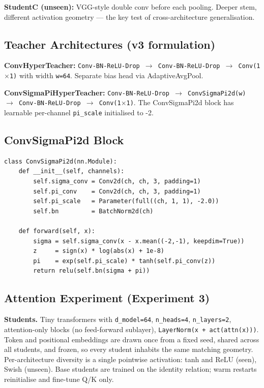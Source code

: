 \documentclass{article}
\begin{document}
\textbf{StudentC (unseen):} VGG-style double conv before each pooling. Deeper stem, different activation geometry --- the key test of cross-architecture generalisation.

\subsection{Teacher Architectures (v3 formulation)}\label{teacher-architectures-v3-formulation}

\textbf{ConvHyperTeacher:} \texttt{Conv-BN-ReLU-Drop\ $\to$\ Conv-BN-ReLU-Drop\ $\to$\ Conv(1$\times$1)} with width \texttt{w=64}. Separate bias head via AdaptiveAvgPool.

\textbf{ConvSigmaPiHyperTeacher:} \texttt{Conv-BN-ReLU-Drop\ $\to$\ ConvSigmaPi2d(w)\ $\to$\ Conv-BN-ReLU-Drop\ $\to$\ Conv(1$\times$1)}. The ConvSigmaPi2d block has learnable per-channel \texttt{pi\_scale} initialised to -2.

\subsection{ConvSigmaPi2d Block}\label{convsigmapi2d-block}

\begin{verbatim}
class ConvSigmaPi2d(nn.Module):
    def __init__(self, channels):
        self.sigma_conv = Conv2d(ch, ch, 3, padding=1)
        self.pi_conv    = Conv2d(ch, ch, 3, padding=1)
        self.pi_scale   = Parameter(full((ch, 1, 1), -2.0))
        self.bn         = BatchNorm2d(ch)

    def forward(self, x):
        sigma = self.sigma_conv(x - x.mean((-2,-1), keepdim=True))
        z     = sign(x) * log(abs(x) + 1e-8)
        pi    = exp(self.pi_scale) * tanh(self.pi_conv(z))
        return relu(self.bn(sigma + pi))
\end{verbatim}

\subsection{Attention Experiment (Experiment 3)}\label{attention-experiment-experiment-3}

\textbf{Students.} Tiny transformers with \texttt{d\_model=64}, \texttt{n\_heads=4}, \texttt{n\_layers=2}, attention-only blocks (no feed-forward sublayer), \texttt{LayerNorm(x\ +\ act(attn(x)))}. Token and positional embeddings are drawn once from a fixed seed, shared across all students, and frozen, so every student inhabits the same matching geometry. Per-architecture diversity is a single pointwise activation: tanh and ReLU (seen), Swish (unseen). Base students are trained on the identity relation; warm restarts reinitialise and fine-tune Q/K only.
\end{document}
